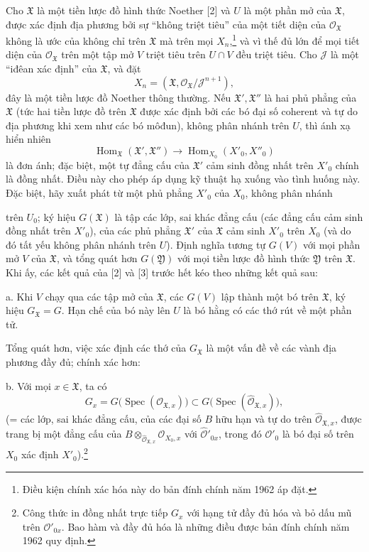 \documentclass[11pt,twoside,openany]{book}
\numberwithin{equation}{section}
\newcommand{\src}[1]{%
  \phantomsection\hypertarget{src:\fgasourceid:#1}{}%
  \marginpar{\raggedleft\footnotesize\sffamily #1}%
}
\newcommand{\fgasourceid}{unset}
\begin{document}
Cho $\mathfrak X$ là một tiền lược đồ hình thức Noether [2] và $U$ là một
phần mở của $\mathfrak X$, được xác định địa phương bởi sự ``không triệt tiêu''
của một tiết diện của $\mathcal O_{\mathfrak X}$ không là ước của không chỉ
trên $\mathfrak X$ mà trên mọi $X_n$,\footnote{Điều kiện chính xác hóa này do
bản đính chính năm 1962 áp đặt.} và vì thế đủ lớn để mọi tiết diện của
$\mathcal O_{\mathfrak X}$ trên một tập mở $V$ triệt tiêu trên $U\cap V$ đều
triệt tiêu. Cho $\mathcal J$ là một ``iđêan xác định'' của $\mathfrak X$, và
đặt
\[
  X_n=(\mathfrak X,\mathcal O_{\mathfrak X}/\mathcal J^{n+1}),
\]
đây là một tiền lược đồ Noether thông thường. Nếu
$\mathfrak X',\mathfrak X''$ là hai phủ phẳng của $\mathfrak X$ (tức hai tiền
lược đồ trên $\mathfrak X$ được xác định bởi các bó đại số coherent và tự do
địa phương khi xem như các bó môđun), không phân nhánh trên $U$, thì ánh xạ
hiển nhiên
\[
  \operatorname{Hom}_{\mathfrak X}(\mathfrak X',\mathfrak X'')
  \longrightarrow
  \operatorname{Hom}_{X_0}(X'_0,X''_0)
\]
là đơn ánh; đặc biệt, một tự đẳng cấu của $\mathfrak X'$ cảm sinh đồng nhất
trên $X'_0$ chính là đồng nhất. Điều này cho phép áp dụng kỹ thuật hạ xuống vào
tình huống này. Đặc biệt, hãy xuất phát từ một phủ phẳng $X'_0$ của $X_0$,
không phân nhánh

\src{388}
trên $U_0$; ký hiệu $G(\mathfrak X)$ là tập các lớp, sai khác đẳng cấu (các
đẳng cấu cảm sinh đồng nhất trên $X'_0$), của các phủ phẳng $\mathfrak X'$ của
$\mathfrak X$ cảm sinh $X'_0$ trên $X_0$ (và do đó tất yếu không phân nhánh
trên $U$). Định nghĩa tương tự $G(V)$ với mọi phần mở $V$ của $\mathfrak X$,
và tổng quát hơn $G(\mathfrak Y)$ với mọi tiền lược đồ hình thức
$\mathfrak Y$ trên $\mathfrak X$. Khi ấy, các kết quả của [2] và [3] trước hết
kéo theo những kết quả sau:

\noindent a. Khi $V$ chạy qua các tập mở của $\mathfrak X$, các $G(V)$ lập
thành một bó trên $\mathfrak X$, ký hiệu $G_{\mathfrak X}=G$. Hạn chế của bó
này lên $U$ là bó hằng có các thớ rút về một phần tử.

Tổng quát hơn, việc xác định các thớ của $G_{\mathfrak X}$ là một vấn đề về
các vành địa phương đầy đủ; chính xác hơn:

\noindent b. Với mọi $x\in\mathfrak X$, ta có
\[
  G_x=G\bigl(\operatorname{Spec}(\mathcal O_{\mathfrak X,x})\bigr)
  \subset
  G\bigl(\operatorname{Spec}(\widehat{\mathcal O}_{\mathfrak X,x})\bigr),
\]
(= các lớp, sai khác đẳng cấu, của các đại số $B$ hữu hạn và tự do trên
$\widehat{\mathcal O}_{\mathfrak X,x}$, được trang bị một đẳng cấu của
$B\otimes_{\widehat{\mathcal O}_{\mathfrak X,x}}\mathcal O_{X_0,x}$ với
$\widehat{\mathcal O}'_{0x}$, trong đó $\mathcal O'_0$ là bó đại số trên
$X_0$ xác định $X'_0$).\footnote{Công thức in đồng nhất trực tiếp $G_x$ với
hạng tử đầy đủ hóa và bỏ dấu mũ trên $\mathcal O'_{0x}$. Bao hàm và đầy đủ hóa
là những điều được bản đính chính năm 1962 quy định.}
\end{document}
